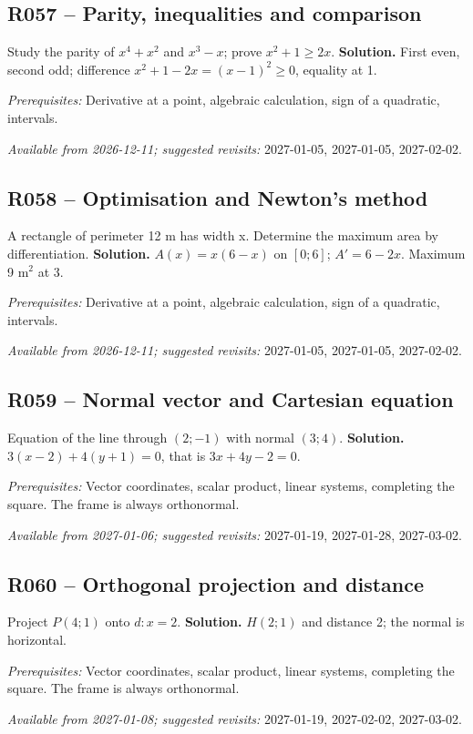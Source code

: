 \subsection*{R057 -- Parity, inequalities and comparison}\label{R057}
Study the parity of $x^4+x^2$ and $x^3-x$; prove $x^2+1\geq2x$.
\ifprof\textbf{Solution.} First even, second odd; difference $x^2+1-2x=(x-1)^2\geq0$, equality at 1.\par\textit{Prerequisites:} Derivative at a point, algebraic calculation, sign of a quadratic, intervals.\par\textit{Available from 2026-12-11; suggested revisits:} 2027-01-05, 2027-01-05, 2027-02-02.\fi
{}\subsection*{R058 -- Optimisation and Newton's method}\label{R058}
A rectangle of perimeter 12 m has width x. Determine the maximum area by differentiation.
\ifprof\textbf{Solution.} $A(x)=x(6-x)$ on $[0;6]$; $A\prime=6-2x$. Maximum 9 m$^2$ at 3.\par\textit{Prerequisites:} Derivative at a point, algebraic calculation, sign of a quadratic, intervals.\par\textit{Available from 2026-12-11; suggested revisits:} 2027-01-05, 2027-01-05, 2027-02-02.\fi
{}\subsection*{R059 -- Normal vector and Cartesian equation}\label{R059}
Equation of the line through $(2;-1)$ with normal $(3;4)$.
\ifprof\textbf{Solution.} $3(x-2)+4(y+1)=0$, that is $3x+4y-2=0$.\par\textit{Prerequisites:} Vector coordinates, scalar product, linear systems, completing the square. The frame is always orthonormal.\par\textit{Available from 2027-01-06; suggested revisits:} 2027-01-19, 2027-01-28, 2027-03-02.\fi
{}\subsection*{R060 -- Orthogonal projection and distance}\label{R060}
Project $P(4;1)$ onto $d:x=2$.
\ifprof\textbf{Solution.} $H(2;1)$ and distance 2; the normal is horizontal.\par\textit{Prerequisites:} Vector coordinates, scalar product, linear systems, completing the square. The frame is always orthonormal.\par\textit{Available from 2027-01-08; suggested revisits:} 2027-01-19, 2027-02-02, 2027-03-02.\fi
